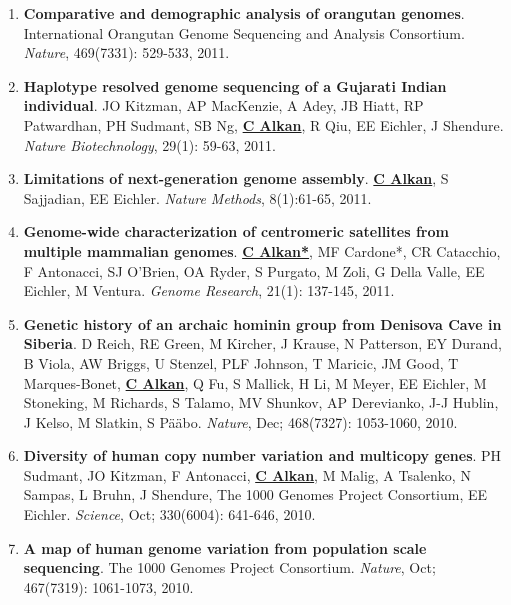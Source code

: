 \begin{enumerate}
\clearpage
\item
{\bf Comparative and demographic analysis of orangutan genomes}. 
International Orangutan Genome Sequencing and Analysis Consortium.
{\em Nature}, 469(7331): 529-533, 2011.

\item
{\bf Haplotype resolved genome sequencing of a Gujarati Indian individual}.
JO Kitzman, AP MacKenzie, A Adey, JB Hiatt, RP Patwardhan, 
PH Sudmant, SB Ng, {\bf {\underline{C Alkan}}}, R Qiu, EE
Eichler, J Shendure.
{\em Nature Biotechnology}, 29(1): 59-63, 2011.

\item
{\bf Limitations of next-generation genome assembly}.
{\bf {\underline {C Alkan}}}, S Sajjadian, EE Eichler.
{\em Nature Methods}, 8(1):61-65, 2011. \\



\item
{\bf Genome-wide characterization of centromeric satellites from multiple mammalian genomes}.
{\bf {\underline {C Alkan*}}}, MF Cardone*, CR Catacchio, F Antonacci,
 SJ O'Brien, OA Ryder, S Purgato, M Zoli, G Della Valle, EE Eichler, M Ventura.
{\em Genome Research}, 21(1): 137-145, 2011.


\item
{\bf Genetic history of an archaic hominin group from Denisova Cave in Siberia}.
D Reich, RE Green, M Kircher, J Krause, 
N Patterson, EY Durand, B Viola, AW Briggs, 
U Stenzel, PLF Johnson, T Maricic, JM Good, 
T Marques-Bonet, {\bf {\underline {C Alkan}}}, Q Fu, S Mallick, H Li, 
M Meyer, EE Eichler, M Stoneking, M Richards, 
S Talamo, MV Shunkov, AP Derevianko, J-J Hublin, 
J Kelso, M Slatkin, S P\"{a}\"{a}bo.
{\em Nature}, Dec;  468(7327): 1053-1060, 2010.

\item
{\bf Diversity of human copy number variation and multicopy genes}. PH Sudmant, JO Kitzman, F Antonacci, 
{\bf {\underline {C Alkan}}}, M Malig, A Tsalenko, N Sampas, L Bruhn, J Shendure, The 1000 Genomes Project Consortium, EE Eichler.
{\em Science}, Oct;  330(6004): 641-646, 2010.

\item
{\bf A map of human genome variation from population scale sequencing}. The 1000 Genomes Project Consortium.
{\em Nature}, Oct;  467(7319): 1061-1073, 2010.


\end{enumerate}
